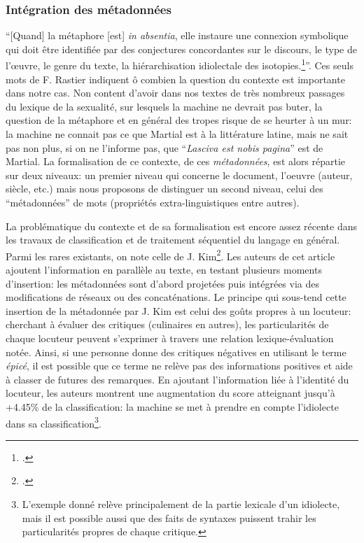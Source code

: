 
\subsubsection{Intégration des métadonnées}
\label{chap4:encodage:metadonnees}

\enquote{[Quand] la métaphore [est] \textit{in absentia}, elle instaure une connexion symbolique qui doit être identifiée par des conjectures concordantes sur le discours, le type de l'œuvre, le genre du texte, la hiérarchisation idiolectale des isotopies.\footcite[p. 98]{rastier_tropes_1994}}. Ces seuls mots de F. Rastier indiquent ô combien la question du contexte est importante dans notre cas. Non content d'avoir dans nos textes de très nombreux passages du lexique de la sexualité, sur lesquels la machine ne devrait pas buter, la question de la métaphore et en général des tropes risque de se heurter à un mur: la machine ne connait pas ce que Martial est à la littérature latine, mais ne sait pas non plus, si on ne l'informe pas, que \enquote{\textit{Lasciva est nobis pagina}} est de Martial. La formalisation de ce contexte, de ces \textit{métadonnées}, est alors répartie sur deux niveaux: un premier niveau qui concerne le document, l'oeuvre (auteur, siècle, etc.) mais nous proposons de distinguer un second niveau, celui des \enquote{métadonnées} de mots (propriétés extra-linguistiques entre autres).

La problématique du contexte et de sa formalisation est encore assez récente dans les travaux de classification et de traitement séquentiel du langage en général. Parmi les rares existants, on note celle de J. Kim\footcite{kim_categorical_2019}. Les auteurs de cet article ajoutent l'information en parallèle au texte, en testant plusieurs moments d'insertion: les métadonnées sont d'abord projetées puis intégrées via des modifications de réseaux ou des concaténations. Le principe qui sous-tend cette insertion de la métadonnée par J. Kim est celui des goûts propres à un locuteur: cherchant à évaluer des critiques (culinaires en autres), les particularités de chaque locuteur peuvent s'exprimer à travers une relation lexique-évaluation notée. Ainsi, si une personne donne des critiques négatives en utilisant le terme \textit{épicé}, il est possible que ce terme ne relève pas des informations positives et aide à classer de futures des remarques. En ajoutant l'information liée à l'identité du locuteur, les auteurs montrent une augmentation du score atteignant jusqu'à +4.45\% de la classification: la machine se met à prendre en compte l'idiolecte dans sa classification\footnote{L'exemple donné relève principalement de la partie lexicale d'un idiolecte, mais il est possible aussi que des faits de syntaxes puissent trahir les particularités propres de chaque critique.}.

